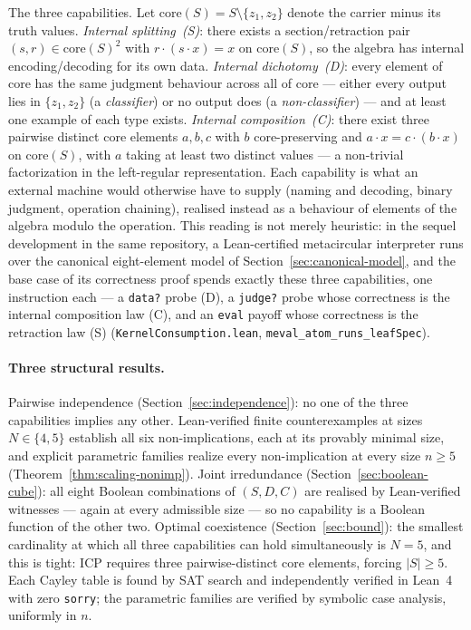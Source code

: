 \documentclass[sigconf,screen]{acmart}
\newcommand{\dotop}{\cdot}
\newcommand{\core}{\mathrm{core}}
\theoremstyle{remark}
\begin{document}
The three capabilities. Let $\core(S) = S \setminus \{z_1, z_2\}$ denote
the carrier minus its truth values. \emph{Internal splitting~(S)}: there
exists a section/retraction pair $(s, r) \in \core(S)^2$ with
$r \dotop (s \dotop x) = x$ on $\core(S)$, so the algebra has internal
encoding/decoding for its own data. \emph{Internal dichotomy~(D)}: every
element of core has the same judgment behaviour across all of core ---
either every output lies in $\{z_1, z_2\}$ (a \emph{classifier}) or no
output does (a \emph{non-classifier}) --- and at least one example of each
type exists. \emph{Internal composition~(C)}: there exist three pairwise
distinct core elements $a, b, c$ with $b$ core-preserving and
$a \dotop x = c \dotop (b \dotop x)$ on $\core(S)$, with $a$ taking at
least two distinct values --- a non-trivial factorization in the
left-regular representation. Each capability is what an external machine
would otherwise have to supply (naming and decoding, binary judgment,
operation chaining), realised instead as a behaviour of elements of the
algebra modulo the operation. This reading is not merely heuristic: in
the sequel development in the same repository, a Lean-certified
metacircular interpreter runs over the canonical eight-element model of
Section~\ref{sec:canonical-model}, and the base case of its correctness
proof spends exactly these three capabilities, one instruction each ---
a \texttt{data?} probe (D), a \texttt{judge?} probe whose correctness is
the internal composition law (C), and an \texttt{eval} payoff whose
correctness is the retraction law (S)
(\texttt{KernelConsumption.lean}, \texttt{meval\_atom\_runs\_leafSpec}).

\paragraph{Three structural results.} Pairwise independence (Section~\ref{sec:independence}):
no one of the three capabilities implies any other. Lean-verified finite
counterexamples at sizes $N \in \{4, 5\}$ establish all six
non-implications, each at its provably minimal size, and explicit
parametric families realize every non-implication at every size
$n \geq 5$ (Theorem~\ref{thm:scaling-nonimp}). Joint irredundance
(Section~\ref{sec:boolean-cube}): all eight Boolean combinations of
$(S, D, C)$ are realised by Lean-verified witnesses --- again at every
admissible size --- so no capability is a Boolean function of the other
two. Optimal coexistence
(Section~\ref{sec:bound}): the smallest cardinality at which all three
capabilities can hold simultaneously is $N = 5$, and this is tight: ICP
requires three pairwise-distinct core elements, forcing $|S| \geq 5$.
Each Cayley table is found by SAT search and independently verified in
Lean~4~\cite{moura21} with zero \texttt{sorry}; the parametric families
are verified by symbolic case analysis, uniformly in $n$.
\end{document}
